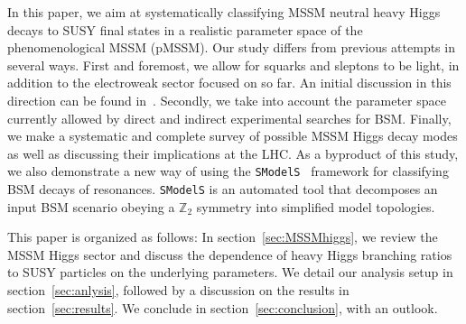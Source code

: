 \documentclass[11pt,a4paper]{article}
\begin{document}
In this paper, we aim at systematically classifying MSSM neutral heavy Higgs decays to SUSY final states in a realistic parameter space of the phenomenological MSSM (pMSSM). Our study differs from previous attempts in several ways. First and foremost, we allow for squarks and sleptons to be light, in addition to the electroweak sector focused on so far. An initial discussion in this direction can be found in~\cite{Barman:2016jov}. Secondly, we take into account the parameter space currently allowed by direct and indirect experimental searches for BSM. Finally, we make a systematic and complete survey of possible MSSM Higgs decay modes as well as discussing their implications at the LHC. As a byproduct of this study, we also demonstrate a new way of using the \texttt{SModelS}~\cite{Ambrogi:2017neo,Kraml:2013mwa,SModelS:wiki} framework for classifying BSM decays of resonances. \texttt{SModelS} is an automated tool that decomposes an input BSM scenario obeying a $\mathbb{Z}_2$ symmetry into simplified model topologies.

This paper is organized as follows: In section~\ref{sec:MSSMhiggs}, we review the MSSM Higgs sector and discuss the dependence of heavy Higgs branching ratios to SUSY particles on the underlying parameters. We detail our analysis setup in section~\ref{sec:anlysis}, followed by a discussion on the results in section~\ref{sec:results}. We conclude in section~\ref{sec:conclusion}, with an outlook.

\end{document}
